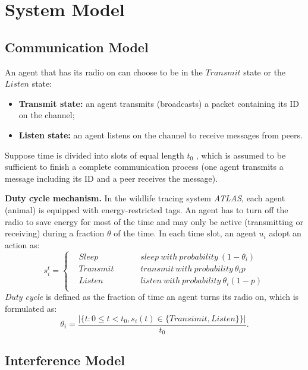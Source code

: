 \section{System Model}
\label{sectionmodel}


\subsection{Communication Model}



An agent that has its radio on can choose to be in the $Transmit$ state
or the $Listen$ state:
\begin{itemize}
\item \textbf{Transmit state:} an agent transmits (broadcasts) 
a packet containing its ID on the channel;
\item  \textbf{Listen state:} an agent listens on 
the channel to receive messages from peers.
\end{itemize}

Suppose time is divided into slots of equal length $t_0$
, which is assumed to be sufficient to finish a complete
communication process (one agent transmits a message including its ID and
a peer receives the message).

\textbf{Duty cycle mechanism.} In the wildlife tracing system \emph{ATLAS}, 
each agent (animal) is equipped with energy-restricted tags.
An agent has to turn off the radio to save
energy for most of the time and may only be active 
(transmitting or receiving) during a fraction $\theta$ of the time.
In each time slot, an agent $u_i$ adopt an action as:
$$ s_i^t=\left\{
\begin{aligned}
&Sleep  & & & &{sleep~ with~ probability~ (1-\theta_i)}  	 \\
&Transmit  & & & &{transmit~ with~ probability~ \theta_i p}	\\
&Listen  & & & &{listen~ with~ probability~\theta_i(1-p)}	\\
\end{aligned}
\right.
$$
\emph{Duty cycle} is defined as the fraction of time an agent turns its radio on, 
which is formulated as:
$$\theta_i=\frac{|\{t: 0\leq t<t_0, s_i(t) \in \{Transimit,Listen\}\}|}{t_0}.
$$

\subsection{Interference Model}

